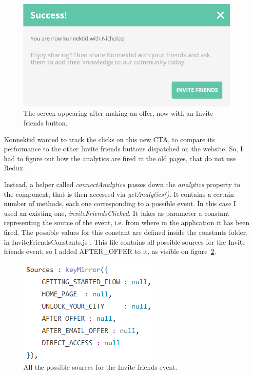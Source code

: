 \begin{figure}[H]
    \centering
    \includegraphics[scale=0.8]{figure/afterOffer.png}
    \caption{The screen appearing after making an offer, now with an Invite friends button.}
    \label{fig:afterOffer}
\end{figure}

Konnektid wanted to track the clicks on this new CTA, to compare its performance to the other Invite friends buttons dispatched on the website. So, I had to figure out how the analytics are fired in the old pages, that do not use Redux.

Instead, a helper called \textit{connectAnalytics} passes down the \textit{analytics} property to the component, that is then accessed via \textit{getAnalytics()}. It contains a certain number of methods, each one corresponding to a possible event. In this case I used an existing one, \textit{inviteFriendsClicked}. It takes as parameter a constant representing the source of the event, i.e. from where in the application it has been fired. The possible values for this constant are defined inside the \guillemotleft{} constants \guillemotright{} folder, in \guillemotleft{} InviteFriendsConstants.js \guillemotright{}. This file contains all possible sources for the Invite friends event, so I added \guillemotleft{} AFTER\_OFFER \guillemotright{} to it, as visible on {\sc figure}~\ref{fig:inviteFriendsConstants}.

\begin{figure}[H]
    \centering
    \includegraphics[scale=0.9]{figure/inviteFriendsConstants.png}
    \caption{All the possible sources for the \guillemotleft{} Invite friends \guillemotright{} event.}
    \label{fig:inviteFriendsConstants}
\end{figure}

